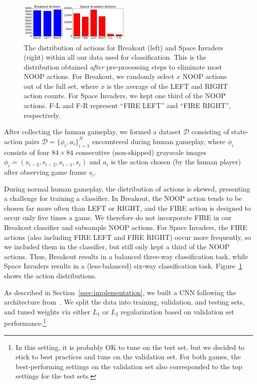 \documentclass[letterpaper, 10pt, conference]{ieeeconf}
\begin{document}
\begin{figure}[t]
\centering
\includegraphics[width=0.48\textwidth]{figures/bar_charts_actions.png}
\caption{\footnotesize
The distribution of actions for Breakout (left) and Space Invaders (right)
within all our data used for classification. This is the distribution obtained
\emph{after} pre-processing steps to eliminate most NOOP actions. For Breakout,
we randomly select $x$ NOOP actions out of the full set, where $x$ is the
average of the LEFT and RIGHT action counts. For Space Invaders, we kept one
third of the NOOP actions. F-L and F-R represent ``FIRE LEFT'' and ``FIRE
RIGHT'', respectively.
}
\label{fig:action_distribution}
\end{figure}

After collecting the human gameplay, we formed a dataset $\mathcal{D}$
consisting of state-action pairs $\mathcal{D}=\{\phi_i, a_i\}_{i=1}^N$
encountered during human gameplay, where $\phi_i$ consists of four $84\times 84$
consecutive (non-skipped) grayscale images $\phi_i =
(s_{i-3},s_{i-2},s_{i-1},s_i)$ and $a_i$ is the action chosen (by the human
player) after observing game frame $s_i$.

During normal human gameplay, the distribution of actions is skewed, presenting
a challenge for training a classifier. In Breakout, the NOOP action tends to be
chosen far more often than LEFT or RIGHT, and the FIRE action is designed to
occur only five times a game. We therefore do not incorporate FIRE in our
Breakout classifier and subsample NOOP actions. For Space Invaders, the FIRE
actions (also including FIRE LEFT and FIRE RIGHT) occur more frequently, so we
included them in the classifier, but still only kept a third of the NOOP
actions.  Thus, Breakout results in a balanced three-way classification task,
while Space Invaders results in a (less-balanced) six-way classification task.
Figure~\ref{fig:action_distribution} shows the action distributions.

As described in Section~\ref{ssec:implementation}, we built a CNN following the
architecture from~\cite{mnih-dqn-2015}. We split the data into training,
validation, and testing sets, and tuned weights via either $L_1$ or $L_2$
regularization based on validation set performance.\footnote{In this setting, it
is probably OK to tune on the test set, but we decided to stick to best
practices and tune on the validation set. For both games, the best-performing
settings on the validation set also corresponded to the top settings for the
test sets.}
\end{document}
